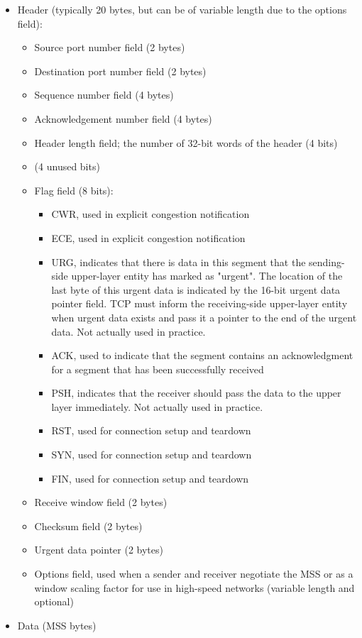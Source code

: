 \documentclass[8pt, table, xcdraw]{article}%
\begin{document}
\begin{itemize}
    \item Header (typically 20 bytes, but can be of variable length due to the options field):
    \begin{itemize}
        \item Source port number field (2 bytes)
        \item Destination port number field (2 bytes)
        \item Sequence number field (4 bytes)
        \item Acknowledgement number field (4 bytes)
        \item Header length field; the number of 32-bit words of the header (4 bits)
        \item (4 unused bits)
        \item Flag field (8 bits):
        \begin{itemize}
            \item CWR, used in explicit congestion notification
            \item ECE, used in explicit congestion notification
            \item URG, indicates that there is data in this segment that the sending-side upper-layer entity has marked as "urgent". The location of the last byte of this urgent data is indicated by the 16-bit urgent data pointer field. TCP must inform the receiving-side upper-layer entity when urgent data exists and pass it a pointer to the end of the urgent data. Not actually used in practice.
            \item ACK, used to indicate that the segment contains an acknowledgment for a segment that has been successfully received
            \item PSH, indicates that the receiver should pass the data to the upper layer immediately. Not actually used in practice.
            \item RST, used for connection setup and teardown
            \item SYN, used for connection setup and teardown
            \item FIN, used for connection setup and teardown
        \end{itemize}
        \item Receive window field (2 bytes)
        \item Checksum field (2 bytes)
        \item Urgent data pointer (2 bytes)
        \item Options field, used when a sender and receiver negotiate the MSS or as a window scaling factor for use in high-speed networks (variable length and optional)
    \end{itemize}
    \item Data (MSS bytes)
\end{itemize}
\end{document}

